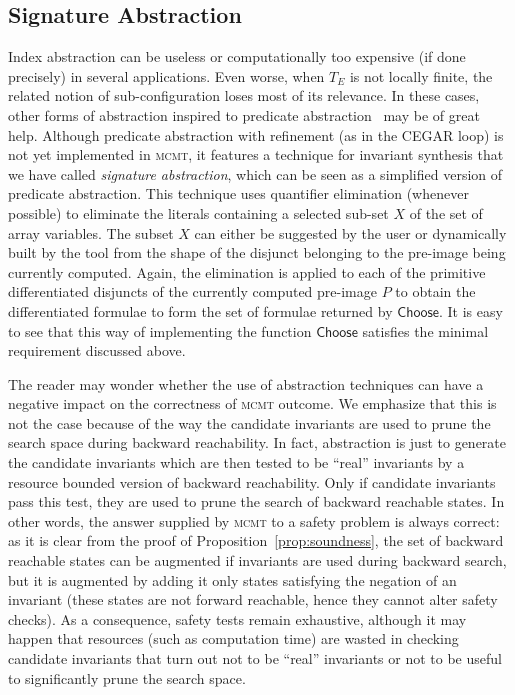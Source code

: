 \documentclass{LMCS}
\theoremstyle{plain}\newtheorem{assumption}[thm]{Assumption}
\theoremstyle{plain}\newtheorem{proposition}[thm]{Proposition}
\theoremstyle{plain}\newtheorem{property}[thm]{Property}
\theoremstyle{plain}\newtheorem{example}[thm]{Example}
\theoremstyle{plain}\newtheorem{claim}[thm]{Claim}
\theoremstyle{plain}\newtheorem{lemma}[thm]{Lemma}
\begin{document}
\subsection{Signature Abstraction}
\label{subsec:abs-inv}
Index abstraction can be useless or computationally too expensive (if
done precisely) in several applications.  Even worse, when $T_E$ is
not locally finite, the related notion of sub-configuration loses most
of its relevance.  In these cases, other forms of abstraction inspired
to predicate abstraction~\cite{seminal} may be of great help.
Although predicate abstraction with refinement (as in the CEGAR loop)
is not yet implemented in \textsc{mcmt}, it features a technique for
invariant synthesis that we have called \emph{signature abstraction},
which can be seen as a simplified version of predicate abstraction.
This technique uses quantifier elimination (whenever possible) to
eliminate the literals containing a selected sub-set $X$ of the set of
array variables.  The subset $X$ can either be suggested by the user
or dynamically built by the tool from the shape of the disjunct
belonging to the pre-image being currently computed.  Again, the
elimination is applied to each of the primitive differentiated
disjuncts of the currently computed pre-image $P$ to obtain the
differentiated formulae to form the set of formulae returned by
$\mathsf{Choose}$.  It is easy to see that this way of implementing
the function $\mathsf{Choose}$ satisfies the minimal requirement
discussed above.
\begin{rem}
  \label{remr}
The reader may wonder whether the use of abstraction techniques can
  have a negative impact on the correctness of \textsc{mcmt} outcome.
We emphasize that this is not the case because of the way the
  candidate invariants are used to prune the search space during
  backward reachability.  In fact, abstraction is just to generate the
  candidate invariants which are then tested to be ``real'' invariants
  by a resource bounded version of backward reachability.  Only if
  candidate invariants pass this test, they are used to prune the
  search of backward reachable states.  In other words, the answer
  supplied by \textsc{mcmt} to a safety problem is always correct: as
  it is clear from the proof of Proposition~\ref{prop:soundness}, the
  set of backward reachable states can be augmented if invariants are
  used during backward search, but it is augmented by adding it only
  states satisfying the negation of an invariant (these states are not
  forward reachable, hence they cannot alter safety checks). As a
  consequence, safety tests remain exhaustive,
although it may happen that resources (such as computation
  time) are wasted in checking candidate invariants that turn out not
  to be ``real'' invariants
or not to be useful to significantly  prune the search space.
\end{rem}
\end{document}
